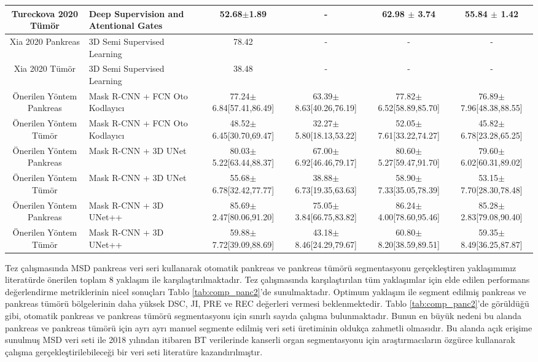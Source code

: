 \begin{table}
\begin{adjustbox}{width=\textwidth}
\begin{tabular}{cm{8cm}cccc}
			Tureckova 2020 \cite{tureckova2020improving}  Tümör  &  Deep Supervision and Atentional Gates  & 52.68$\pm$1.89  &   -   &   62.98 $\pm$ 3.74    &  55.84 $\pm$ 1.42   \\ 	
			\toprule
			Xia 2020 \cite{xia20203d}  Pankreas  &  3D Semi Supervised Learning  & 78.42  &   -   &   -    & -   \\
			Xia 2020 \cite{xia20203d}  Tümör  &  3D Semi Supervised Learning  & 38.48  &   -   &   -    & -   \\ 	
			\toprule
			Önerilen Yöntem Pankreas & Mask R-CNN + FCN Oto Kodlayıcı  & 77.24$\pm$6.84[57.41,86.49] & 63.39$\pm$8.63[40.26,76.19] & 77.82$\pm$6.52[58.89,85.70] & 76.89$\pm$7.96[48.38,88.55] \\
			Önerilen Yöntem Tümör & Mask R-CNN + FCN Oto Kodlayıcı & 48.52$\pm$6.45[30.70,69.47] & 32.27$\pm$5.80[18.13,53.22] & 52.05$\pm$7.61[33.22,74.27] & 45.82$\pm$6.78[23.28,65.25] \\
			\toprule			
			Önerilen Yöntem Pankreas & Mask R-CNN + 3D UNet &	80.03$\pm$5.22[63.44,88.37] & 67.00$\pm$6.92[46.46,79.17] & 80.60$\pm$5.27[59.47,91.70] & 79.60$\pm$6.02[60.31,89.02] \\
			Önerilen Yöntem Tümör & Mask R-CNN + 3D UNet & 55.68$\pm$6.78[32.42,77.77] & 38.88$\pm$6.73[19.35,63.63] & 58.90$\pm$7.33[35.05,78.39] & 53.15$\pm$7.70[28.30,78.48] \\
			\toprule
			Önerilen Yöntem Pankreas & Mask R-CNN + 3D UNet++  & 85.69$\pm$2.47[80.06,91.20] & 75.05$\pm$3.84[66.75,83.82] & 86.24$\pm$4.00[78.60,95.46] & 85.28$\pm$2.83[79.08,90.40] \\
			Önerilen Yöntem Tümör & Mask R-CNN + 3D UNet++  & 59.88$\pm$7.72[39.09,88.69] & 43.18$\pm$8.46[24.29,79.67] & 60.80$\pm$8.20[38.59,89.51] & 59.35$\pm$8.49[36.25,87.87] \\

			 
			\bottomrule
		\end{tabular}
	\end{adjustbox}
\end{table}

Tez çalışmasında MSD pankreas veri seri kullanarak otomatik pankreas ve pankreas tümörü segmentasyonu gerçekleştiren yaklaşımımız literatürde önerilen toplam 8 yaklaşım ile karşılaştırılmaktadır. Tez çalışmasında karşılaştırılan tüm yaklaşımlar için elde edilen performans değerlendirme metriklerinin nicel sonuçları Tablo \ref{tab:comp_panc2}'de sunulmaktadır. Optimum yaklaşım ile segment edilmiş pankreas ve pankreas tümörü bölgelerinin daha yüksek DSC, JI, PRE ve REC değerleri vermesi beklenmektedir. Tablo \ref{tab:comp_panc2}'de görüldüğü gibi, otomatik pankreas ve pankreas tümörü segmentasyonu için sınırlı sayıda çalışma bulunmaktadır. Bunun en büyük nedeni bu alanda pankreas ve pankreas tümörü için ayrı ayrı manuel segmente edilmiş veri seti üretiminin oldukça zahmetli olmasıdır. Bu alanda açık erişime sunulmuş MSD veri seti ile 2018 yılından itibaren BT verilerinde kanserli organ segmentasyonu için araştırmacıların özgürce kullanarak çalışma gerçekleştirilebileceği bir veri seti literatüre kazandırılmıştır. 

